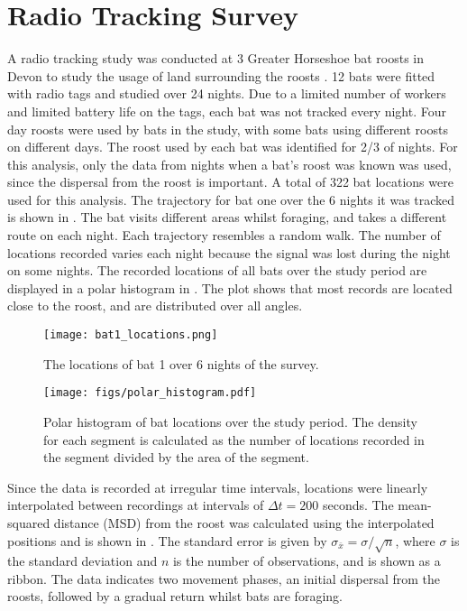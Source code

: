 
\section{Radio Tracking Survey} \label{sect:radiotrack}

A radio tracking study was conducted at 3 Greater Horseshoe bat roosts in Devon to
study the usage of land surrounding the roosts \cite{Mathews2009}. 12 bats were fitted with
radio tags and studied over 24 nights. Due to a limited number of workers and
 limited battery life on the tags, each bat was not tracked every night. Four day
 roosts were used by bats in the study, with some bats using different roosts on
 different days. The roost used by each bat was identified for 2/3 of nights.
 For this analysis, only the
data from nights when a bat's roost was known was used, since the dispersal
from the roost is important.
A total of 322 bat locations were used for this analysis. The trajectory for bat
one over the 6 nights it was tracked is shown in . The bat visits different areas whilst foraging, and takes a different route on each night. Each trajectory resembles a random walk. The number of
locations recorded varies each night because the signal was lost during the night
 on some nights. The recorded locations of all bats over the study period are displayed in a polar histogram in . The plot shows that most records are located close to the roost, and are distributed over all angles.

\begin{figure} [h]
    \centering
        \texttt{[image: bat1\_locations.png]}
        \caption{The locations of bat 1 over 6 nights of the survey.}
    \label{fig:bat1}
\end{figure}

\begin{figure}
\centering
    \texttt{[image: figs/polar\_histogram.pdf]}
    \caption{Polar histogram of bat locations over the study period. The density for each segment is calculated as the number of locations recorded in the segment divided by the area of the segment.}
\label{fig:polar_histogram}
\end{figure}


Since the data is recorded at irregular time intervals, locations were linearly
interpolated between recordings at intervals of $\Delta t = 200$ seconds.
The mean-squared distance (MSD) from the roost was calculated using the
interpolated positions and is shown in . The standard error is given by $\sigma_{\bar{x}} = \sigma/\sqrt{n}$, where
$\sigma$ is the standard deviation and $n$ is the number of observations, and is
shown as a ribbon. The data indicates two movement phases, an initial dispersal from the roosts, followed by a gradual return whilst bats are foraging.

